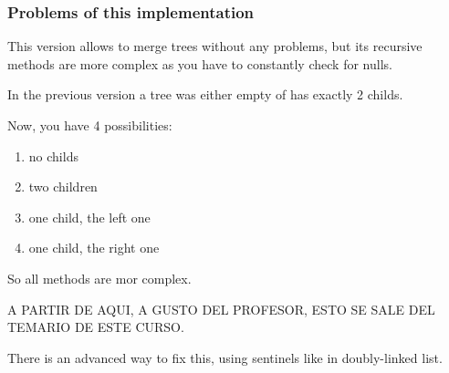 \documentclass[a4paper, 9pt]{extarticle}
\begin{document}
\newpage
\subsubsection{Problems of this implementation}

This version allows to merge trees without any problems, but its recursive
methods are more complex as you have to constantly check for nulls.

In the previous version a tree was either empty of has exactly 2 childs.

Now, you have 4 possibilities:

\begin{enumerate}

  \item no childs

  \item two children

  \item one child, the left one

  \item one child, the right one

\end{enumerate}

So all methods are mor complex.

A PARTIR DE AQUI, A GUSTO DEL PROFESOR, ESTO SE SALE DEL TEMARIO DE ESTE CURSO.

There is an advanced way to fix this, using sentinels like in doubly-linked list.

\begin{multicols}{2}
\end{multicols}
\end{document}
